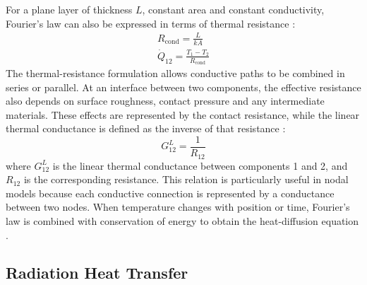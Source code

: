For a plane layer of thickness $L$, constant area and constant conductivity, Fourier's law 
can also be expressed in terms of thermal resistance \cite{heattransfer,hmt_f&a}:
\begin{gather}
    R_{\mathrm{cond}} = \frac{L}{kA}
    \label{eq:conductive_resistance}
    \\[0.6em]
    \dot{Q}_{12} = \frac{T_{1}-T_{2}}{R_{\mathrm{cond}}}
    \label{eq:conductive_resistance_heat_flow}
\end{gather}
The thermal-resistance formulation allows conductive paths to be combined in series or 
parallel. At an interface between two components, the effective resistance also depends 
on surface roughness, contact pressure and any intermediate materials. These effects are 
represented by the contact resistance, while the linear thermal conductance is defined as 
the inverse of that resistance 
\cite{hmt_f&a,th_handbook}:
\begin{equation}
    G_{12}^{L}
    =
    \frac{1}{R_{12}}
    \label{eq:linear_thermal_conductance}
\end{equation}
where $G_{12}^{L}$ is the linear thermal conductance between components 1 and 2, and 
$R_{12}$ is the corresponding resistance. This relation is particularly useful in nodal 
models because each conductive connection is represented by a conductance between two 
nodes. When temperature changes with position or time, Fourier's law is combined with 
conservation of energy to obtain the heat-diffusion equation 
\cite{heattransfer,hmt_f&a,thermal_eng_man}.

\subsection{Radiation Heat Transfer}

